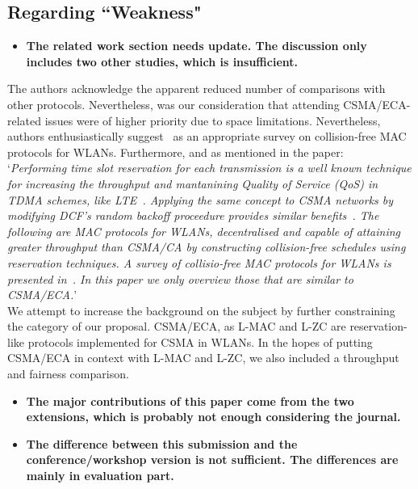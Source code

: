 \documentclass[]{article}
\begin{document}
	\subsection{Regarding ``Weakness"}
		\begin{itemize}
			\item {\bfseries The related work section needs update. The discussion only includes two other studies, which is insufficient.}
		\end{itemize}
		
		The authors acknowledge the apparent reduced number of comparisons with other protocols. Nevertheless, was our consideration that attending CSMA/ECA-related issues were of higher priority due to space limitations. Nevertheless, authors enthusiastically suggest~\cite{L_MAC} as an appropriate survey on collision-free MAC protocols for WLANs. Furthermore, and as mentioned in the paper:\\
		
		`\emph{Performing time slot reservation for each transmission is a well known technique for increasing the throughput and mantanining Quality of Service (QoS) in TDMA schemes, like LTE~\cite{canoLTEcoexistence}. Applying the same concept to CSMA networks by modifying DCF's random backoff proceedure provides similar benefits~\cite{HE}. The following are MAC protocols for WLANs, decentralised and capable of attaining greater throughput than CSMA/CA by constructing collision-free schedules using reservation techniques. A survey of collisio-free MAC protocols for WLANs is presented in~\cite{L_MAC}. In this paper we only overview those that are similar to CSMA/ECA.}'\\
		
		We attempt to increase the background on the subject by further constraining the category of our proposal. CSMA/ECA, as L-MAC and L-ZC are reservation-like protocols implemented for CSMA in WLANs. In the hopes of putting CSMA/ECA in context with L-MAC and L-ZC, we also included a throughput and fairness comparison.
		
		\begin{itemize}
			\item {\bfseries The major contributions of this paper come from the two extensions, which is probably not enough considering the journal.}
			\item {\bfseries The difference between this submission and the conference/workshop version is not sufficient. The differences are mainly in evaluation part.}
		\end{itemize}
		
\end{document}
